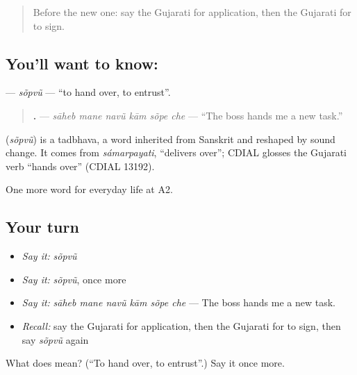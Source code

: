 \label{lesson:GU-C248-sopvu}



\begin{quote}
Before the new one: say the Gujarati for application, then the Gujarati for to sign.
\end{quote}

\subsection*{You'll want to know: }
\textbf{} — \emph{sõpvũ} — \textquotedblleft{}to hand over, to entrust\textquotedblright{}.

\begin{quote}
\textbf{     .} — \emph{sāheb mane navũ kām sõpe che} — \textquotedblleft{}The boss hands me a new task.\textquotedblright{}
\end{quote}

\begin{cousinweb}
\textbf{} (\emph{sõpvũ}) is a tadbhava, a word inherited from Sanskrit and reshaped by sound change. It comes from \emph{sámarpayati}, \textquotedblleft{}delivers over\textquotedblright{}; CDIAL glosses the Gujarati verb \textquotedblleft{}hands over\textquotedblright{} (CDIAL 13192).
\end{cousinweb}

\begin{grammarlens}[title={What you've built}]
One more word for everyday life at A2.
\end{grammarlens}

\subsection*{Your turn}
\begin{itemize}
\raggedright
  \item \emph{Say it:} \emph{sõpvũ}
  \item \emph{Say it:} \emph{sõpvũ}, once more
  \item \emph{Say it:} \emph{sāheb mane navũ kām sõpe che} — The boss hands me a new task.
  \item \emph{Recall:} say the Gujarati for application, then the Gujarati for to sign, then say \emph{sõpvũ} again
\end{itemize}

\begin{tcolorbox}[breakable,colback=teal!4,colframe=teal!35!black,title={Before you move on}]
What does  mean? (\textquotedblleft{}To hand over, to entrust\textquotedblright{}.) Say it once more.
\end{tcolorbox}
